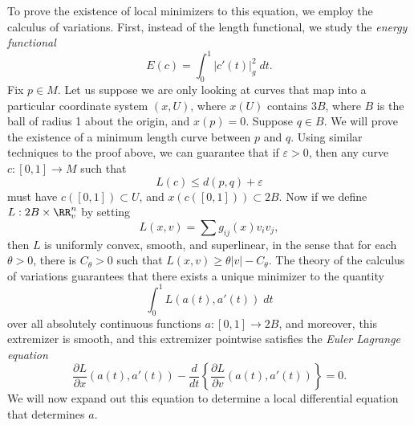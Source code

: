 \begin{comment}
    Together with the inequality that for all $v,w \in \RR^n$,
    \begin{align*}
        |\sqrt{ v G(t) v } - \sqrt{ w G(t) w }| &\lesssim \frac{v G(t) v - w G(t) w}{|v| + |w|}\\
        &\lesssim \frac{(v - w) G(t) (v - w)}{|v| + |w|}\\
        &\lesssim \frac{|v - w|^2}{|v| + |w|} \lesssim |v - w|,
    \end{align*}
    we conclude that
    \[ \limsup_{\delta \to 0} |L(c_\delta) - L(c)| \lesssim \limsup_{\delta \to 0} \| c_\delta - c \|_{L^1} = 0. \]
    Thus we can approximate rectifiable curves by smooth curves with respect to their length.
\end{remark}

\end{comment}

To prove the existence of local minimizers to this equation, we employ the calculus of variations. First, instead of the length functional, we study the \emph{energy functional}
%
\[ E(c) = \int_0^1 |c'(t)|_g^2\; dt. \]
%
Fix $p \in M$. Let us suppose we are only looking at curves that map into a particular coordinate system $(x,U)$, where $x(U)$ contains $3B$, where $B$ is the ball of radius 1 about the origin, and $x(p) = 0$. Suppose $q \in B$. We will prove the existence of a minimum length curve between $p$ and $q$. Using similar techniques to the proof above, we can guarantee that if $\varepsilon > 0$, then any curve $c: [0,1] \to M$ such that
%
\[ L(c) \leq d(p,q) + \varepsilon \]
%
must have $c([0,1]) \subset U$, and $x(c([0,1])) \subset 2B$. Now if we define $L: 2B \times \RR^n_v$ by setting
%
\[ L(x,v) = \sum g_{ij}(x) v_i v_j, \]
%
%
then $L$ is uniformly convex, smooth, and superlinear, in the sense that for each $\theta > 0$, there is $C_\theta > 0$ such that $L(x,v) \geq \theta |v| - C_\theta$.
%
%
The theory of the calculus of variations guarantees that there exists a unique minimizer to the quantity
%
\[ \int_0^1 L(a(t), a'(t))\; dt \]
%
over all absolutely continuous functions $a: [0,1] \to 2B$, and moreover, this extremizer is smooth, and this extremizer pointwise satisfies the \emph{Euler Lagrange equation}
%
\[ \frac{\partial L}{\partial x}(a(t), a'(t)) - \frac{d}{dt} \left\{ \frac{\partial L}{\partial v}(a(t), a'(t)) \right\} = 0. \]
%
We will now expand out this equation to determine a local differential equation that determines $a$.

